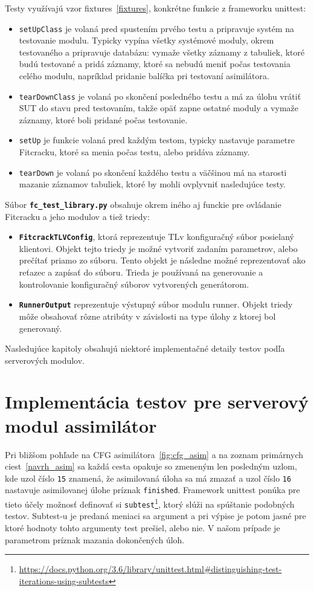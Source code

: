 Testy využívajú vzor fixtures~\ref{fixtures}, konkrétne funkcie z frameworku unittest:
\begin{itemize}
	\item \texttt{setUpClass} je volaná pred spustením prvého testu a pripravuje systém na testovanie modulu.
		Typicky vypína všetky systémové moduly, okrem testovaného a pripravuje databázu: vymaže všetky záznamy z tabuliek, ktoré budú testované a pridá záznamy, ktoré sa nebudú meniť počas testovania celého modulu, napríklad pridanie balíčka pri testovaní asimilátora.
	\item \texttt{tearDownClass}  je volaná po skončení posledného testu a má za úlohu vrátiť SUT do stavu pred testovaním, takže opäť zapne ostatné moduly a vymaže záznamy, ktoré boli pridané počas testovanie.
	\item \texttt{setUp} je funkcie volaná pred každým testom, typicky nastavuje parametre Fitcracku, ktoré sa menia počas testu, alebo pridáva záznamy.
	\item \texttt{tearDown} je volaná po skončení každého testu a väčšinou má na starosti mazanie záznamov tabuliek, ktoré by mohli ovplyvniť nasledujúce testy.
\end{itemize}

Súbor \textbf{\texttt{fc\_test\_library.py}} obsahuje okrem iného aj funckie pre ovládanie Fitcracku a jeho modulov a tiež triedy:
\begin{itemize}
	\item \textbf{\texttt{FitcrackTLVConfig}}, ktorá reprezentuje TLv konfiguračný súbor posielaný klientovi. 
		Objekt tejto triedy je možné vytvoriť zadaním parametrov, alebo prečítať priamo zo súboru.
		Tento objekt je následne možné reprezentovať ako reťazec a zapísať do súboru.
		Trieda je používaná na generovanie a kontrolovanie konfiguračný súborov vytvorených generátorom.
	\item \textbf{\texttt{RunnerOutput}} reprezentuje výstupný súbor modulu runner. Objekt triedy môže obsahovať rôzne atribúty v závislosti na type úlohy z ktorej bol generovaný.
\end{itemize}

Nasledujúce kapitoly obsahujú niektoré implementačné detaily testov podľa serverových modulov.

\section{Implementácia testov pre serverový modul assimilátor}
\label{impl_asim}
Pri bližšom pohľade na CFG asimilátora~\ref{fig:cfg_asim} a na zoznam primárnych ciest~\ref{navrh_asim} sa každá cesta opakuje so zmeneným len posledným uzlom, kde uzol číslo \texttt{15} znamená, že asimilovaná úloha sa má zmazať a uzol číslo \texttt{16} nastavuje asimilovanej úlohe príznak \texttt{finished}.
Framework unittest ponúka pre tieto účely možnosť definovať si \texttt{subtest}\footnote{\url{https://docs.python.org/3.6/library/unittest.html\#distinguishing-test-iterations-using-subtests}}, ktorý slúži na spúštanie podobných testov.
Subtest-u je predaná meniaci sa argument a pri výpise je potom jasné pre ktoré hodnoty tohto argumenty test prešiel, alebo nie.
V našom prípade je parametrom príznak mazania dokončených úloh.

